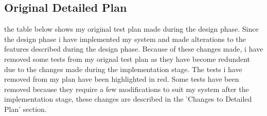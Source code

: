 \begin{landscape}
\begin{center}
\begin{tabular}{|p{2cm}|p{5cm}|p{5cm}|p{4cm}|}
    \end{tabular}
\end{center}

\subsection{Original Detailed Plan}

\begin{flushleft}

the table below shows my original test plan made during the design phase. Since the design phase i have implemented my system and made alterations to the features described during the design phase. Because of these changes made, i have removed some tests from my orignal test plan as they have become redundent due to the changes made during the implementation stage. The tests i have removed from my plan have been highlighted in red. Some tests have been removed because they require a few modifications to suit my system after the implementation stage, these changes are described in the 'Changes to Detailed Plan' section. 


\end{flushleft}
\end{landscape}
